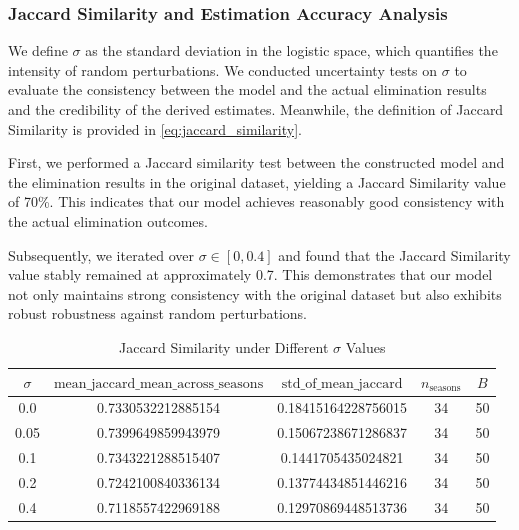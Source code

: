 \subsubsection{Jaccard Similarity and Estimation Accuracy Analysis}
We define $\sigma$ as the standard deviation in the logistic space, which quantifies the intensity of random perturbations. We conducted uncertainty tests on $\sigma$ to evaluate the consistency between the model and the actual elimination results and the credibility of the derived estimates. Meanwhile, the definition of Jaccard Similarity is provided in \ref{eq:jaccard_similarity}.

First, we performed a Jaccard similarity test between the constructed model and the elimination results in the original dataset, yielding a Jaccard Similarity value of 70\%. This indicates that our model achieves reasonably good consistency with the actual elimination outcomes.

Subsequently, we iterated over $\sigma \in [0, 0.4]$ and found that the Jaccard Similarity value stably remained at approximately 0.7. This demonstrates that our model not only maintains strong consistency with the original dataset but also exhibits robust robustness against random perturbations.

\begin{table}[htbp]
    \centering
    \caption{Jaccard Similarity under Different $\sigma$ Values}
    \label{tab:jaccard_sigma}
    \footnotesize %
    \begin{tabular}{ccccc} %
        \toprule %
        $\sigma$ & $\text{mean\_jaccard\_mean\_across\_seasons}$ & $\text{std\_of\_mean\_jaccard}$ & $n_{\text{seasons}}$ & $B$ \\
        \midrule %
        0.0  & 0.7330532212885154 & 0.18415164228756015 & 34 & 50 \\
        0.05 & 0.7399649859943979 & 0.15067238671286837 & 34 & 50 \\
        0.1  & 0.7343221288515407 & 0.1441705435024821  & 34 & 50 \\
        0.2  & 0.7242100840336134 & 0.13774434851446216 & 34 & 50 \\
        0.4  & 0.7118557422969188 & 0.12970869448513736 & 34 & 50 \\
        \bottomrule %
    \end{tabular}
\end{table}


